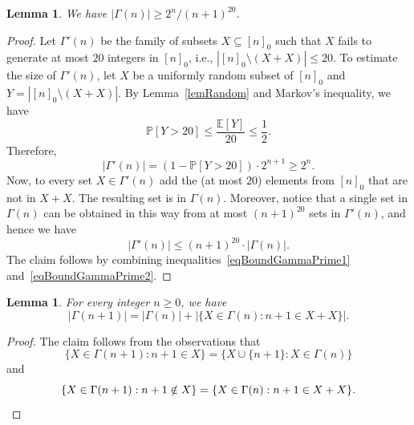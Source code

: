 \documentclass{article}
\newcommand{\ev}{\mathbb{E}}
\newcommand{\prob}{\mathbb{P}}
\newtheorem{lemma}[theorem]{Lemma}
\begin{document}
\begin{lemma}
    \label{lemFirstLowerBound}
    We have $|\Gamma(n)| \ge 2^n / (n+1)^{20}$.
\end{lemma}
\begin{proof}
    Let $\Gamma'(n)$ be the family of subsets $X \subseteq [n]_0$ such that $X$ fails to generate at most $20$ integers in $[n]_0$, i.e., $|[n]_0 \setminus (X + X)| \le 20$.
    To estimate the size of $\Gamma'(n)$, let $X$ be a uniformly random subset of $[n]_0$ and $Y = |[n]_0 \setminus (X + X)|$.
    By Lemma~\ref{lemRandom} and Markov's inequality, we have
    \[
        \prob[Y > 20] \le \frac{\ev[Y]}{20} \le \frac{1}{2}.
    \]
    Therefore,
    \begin{equation}
        \label{eqBoundGammaPrime1}
        |\Gamma'(n)| = (1 - \prob[Y > 20]) \cdot 2^{n+1} \ge 2^n.
    \end{equation}
    Now, to every set $X \in \Gamma'(n)$ add the (at most $20$) elements from $[n]_0$ that are not in $X + X$.
    The resulting set is in $\Gamma(n)$.
    Moreover, notice that a single set in $\Gamma(n)$ can be obtained in this way from at most $(n+1)^{20}$ sets in $\Gamma'(n)$, and hence we have
    \begin{equation}
        \label{eqBoundGammaPrime2}
        |\Gamma'(n)| \le (n+1)^{20} \cdot |\Gamma(n)|.
    \end{equation}
    The claim follows by combining inequalities~\eqref{eqBoundGammaPrime1} and~\eqref{eqBoundGammaPrime2}.
\end{proof}

\begin{lemma}
    \label{lemRecurrence}
    For every integer $n \ge 0$, we have
    \[
        |\Gamma(n+1)| = |\Gamma(n)| + |\{X\in \Gamma(n) : n + 1 \in X+X\}|.
    \]
\end{lemma}
\begin{proof}
    The claim follows from the observations that
    \[
        \{ X \in \Gamma(n+1) : n + 1 \in X \}
        = \{ X \cup \{n + 1\} : X \in \Gamma(n) \}
    \]
    and
    \[
        \{ X \in \Gamma(n+1) : n + 1 \notin X \}
        = \{ X \in \Gamma(n) : n + 1 \in X + X\}. \qedhere
    \]
\end{proof}
\end{document}
